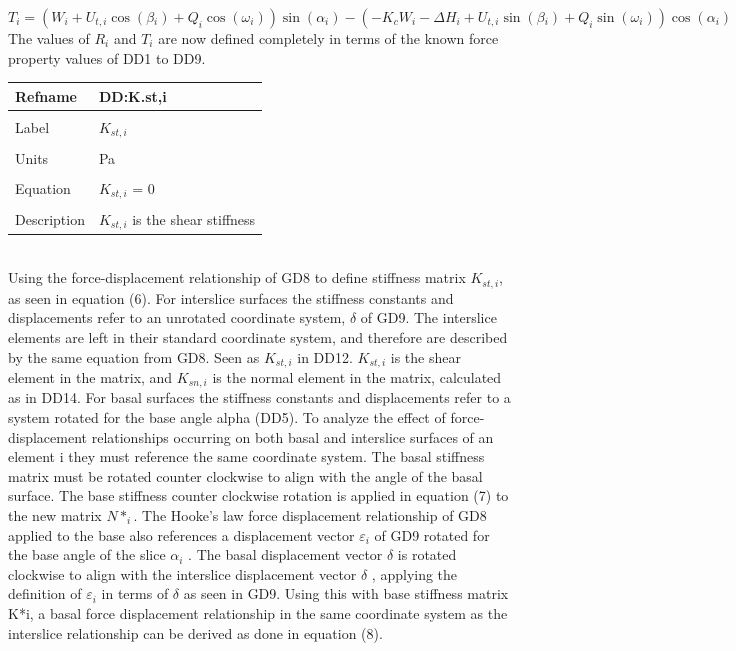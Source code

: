 \documentclass[12pt]{article}
\begin{document}
\begin{equation}
T_{i}=\left(W_{i}+U_{t,i}\cos\left(\beta{}_{i}\right)+Q_{i}\cos\left(\omega{}_{i}\right)\right)\sin\left(\alpha{}_{i}\right)-\left(-K_{c}W_{i}-\Delta{}H_{i}+U_{t,i}\sin\left(\beta{}_{i}\right)+Q_{i}\sin\left(\omega{}_{i}\right)\right)\cos\left(\alpha{}_{i}\right)
\end{equation}
The values of $R_{i}$ and $T_{i}$ are now defined completely in terms of the known force property values of DD1 to DD9.
~\newline
\noindent \begin{minipage}{\textwidth}
\begin{tabular}{p{} p{}}
\toprule \textbf{Refname} & \textbf{DD:K.st,i}
\label{DD:K.st,i}
\\ \midrule \\
Label & $K_{st,i}$
\\ \midrule \\
Units & Pa
\\ \midrule \\
Equation & $K_{st,i}$ = $0$
\\ \midrule \\
Description & $K_{st,i}$ is the shear stiffness
\\ \bottomrule \end{tabular}
\end{minipage}\\
Using the force-displacement relationship of GD8 to define stiffness matrix $K_{st,i}$, as seen in equation (6).
For interslice surfaces the stiffness constants and displacements refer to an unrotated coordinate system, $\delta{}$ of GD9. The interslice elements are left in their standard coordinate system, and therefore are described by the same equation from GD8. Seen as $K_{st,i}$ in DD12. $K_{st,i}$ is the shear element in the matrix, and $K_{sn,i}$ is the normal element in the matrix, calculated as in DD14.
For basal surfaces the stiffness constants and displacements refer to a system rotated for the base angle alpha (DD5). To analyze the effect of force-displacement relationships occurring on both basal and interslice surfaces of an element i they must reference the same coordinate system. The basal stiffness matrix must be rotated counter clockwise to align with the angle of the basal surface. The base stiffness counter clockwise rotation is applied in equation (7) to the new matrix $N*_{i}$.
The Hooke's law force displacement relationship of GD8 applied to the base also references a displacement vector $\varepsilon{}_{i}$ of GD9 rotated for the base angle of the slice $\alpha{}_{i}$ . The basal displacement vector $\delta{}$ is rotated clockwise to align with the interslice displacement vector $\delta{}$ , applying the definition of $\varepsilon{}_{i}$ in terms of $\delta{}$ as seen in GD9. Using this with base stiffness matrix K*i, a basal force displacement relationship in the same coordinate system as the interslice relationship can be derived as done in equation (8).
\end{document}
